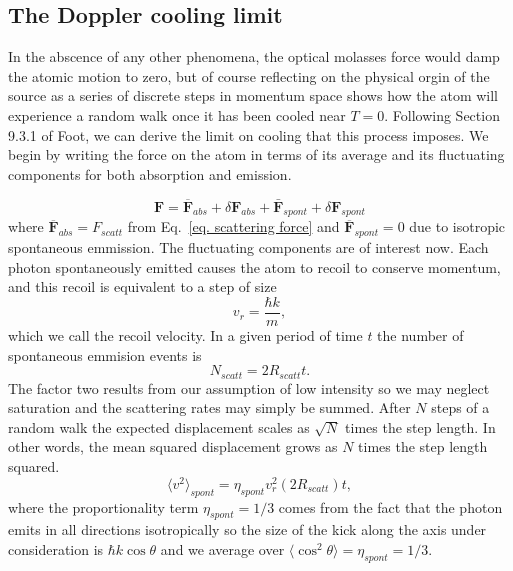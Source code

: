\documentclass[../../main.tex]{subfiles}
\begin{document}
\subsection{The Doppler cooling limit}
In the abscence of any other phenomena, the optical molasses force would damp the atomic motion to zero, but of course reflecting on the physical orgin of the source as a series of discrete steps in momentum space shows how the atom will experience a random walk once it has been cooled near $T=0$. Following Section 9.3.1 of Foot, we can derive the limit on cooling that this process imposes. We begin by writing the force on the atom in terms of its average and its fluctuating components for both absorption and emission. 

\begin{equation}
    \mathbf{F}=\overline{\mathbf{F}}_{abs}+\delta\mathbf{F}_{abs}+\bar{\mathbf{F}}_{spont}+\delta\mathbf{F}_{spont}
\end{equation}
where $\overline{\mathbf{F}}_{abs} =F_{scatt}$ from Eq.~\ref{eq. scattering force} and $\overline{\mathbf{F}}_{spont}=0$ due to isotropic spontaneous emmission. The fluctuating components are of interest now. Each photon spontaneously emitted causes the atom to recoil to conserve momentum, and this recoil is equivalent to a step of size
\begin{equation}\label{eq. recoil velocity}
    v_r=\frac{\hbar k}{m},
\end{equation}
which we call the recoil velocity. In a given period of time $t$ the number of spontaneous emmision events is 
\begin{equation}\label{eq. number of scattering events1}
    N_{scatt}=2R_{scatt}t.
\end{equation}
The factor two results from our assumption of low intensity so we may neglect saturation and the scattering rates may simply be summed. After $N$ steps of a random walk the expected displacement scales as $\sqrt{N}$ times the step length. In other words, the mean squared displacement grows as $N$ times the step length squared. 
\begin{equation}
    \langle v^2 \rangle_{spont}=\eta_{spont} v_r^2(2R_{scatt})t,
\end{equation}
where the proportionality term $\eta_{spont}=1/3$ comes from the fact that the photon emits in all directions isotropically so the size of the kick along the axis under consideration is $\hbar k \cos{\theta}$ and we average over $\langle \cos^2\theta\rangle=\eta_{spont}=1/3$.
\end{document}
